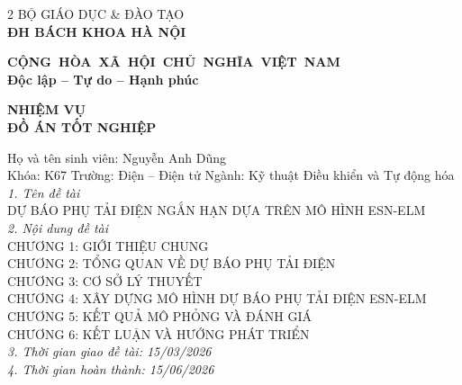 \documentclass{thesis}
\begin{document}
\thispagestyle{empty}
    \newpage

\begin{multicols}{2}
\centering
\hspace{-3cm}BỘ GIÁO DỤC \& ĐÀO TẠO \\ \hspace{-3cm}\textbf{ĐH BÁCH KHOA HÀ NỘI}

\columnbreak

\hspace{-1.6cm}\textbf{CỘNG~HÒA~XÃ~HỘI~CHỦ~NGHĨA~VIỆT~NAM} \\ \hspace{-1.6cm}\textbf{Độc lập -- Tự do -- Hạnh phúc}

\end{multicols}

\begin{center}
   \textbf{NHIỆM VỤ \\ĐỒ ÁN TỐT NGHIỆP} 
\end{center}


\hspace{-1cm}Họ và tên sinh viên: Nguyễn Anh Dũng\\Khóa: K67 \hfill Trường: Điện -- Điện tử \hfill Ngành: Kỹ thuật Điều khiển và Tự động hóa\\
    
    
    \hspace{-1cm}\textit{1. Tên đề tài}\\
             DỰ BÁO PHỤ TẢI ĐIỆN NGẮN HẠN DỰA TRÊN MÔ HÌNH ESN-ELM \\[0.2cm]
    \textit{2. Nội dung đề tài}\\
            CHƯƠNG 1: GIỚI THIỆU CHUNG\\[0.1cm]
            CHƯƠNG 2: TỔNG QUAN VỀ DỰ BÁO PHỤ TẢI ĐIỆN\\[0.1cm]
            CHƯƠNG 3: CƠ SỞ LÝ THUYẾT\\[0.1cm]
            CHƯƠNG 4: XÂY DỰNG MÔ HÌNH DỰ BÁO PHỤ TẢI ĐIỆN ESN-ELM\\[0.1cm]
            CHƯƠNG 5: KẾT QUẢ MÔ PHỎNG VÀ ĐÁNH GIÁ\\[0.1cm]
            CHƯƠNG 6: KẾT LUẬN VÀ HƯỚNG PHÁT TRIỂN \\[0.2cm]
    \textit{3. Thời gian giao đề tài: 15/03/2026} \\[0.2cm]
    \textit{4. Thời gian hoàn thành: 15/06/2026} \\[0.2cm]
\end{document}
